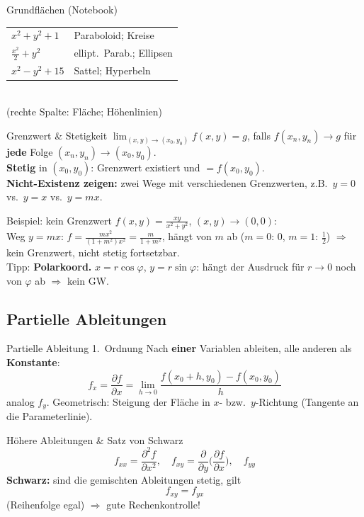 \documentclass[a4paper, fontsize=7pt]{scrartcl}
\newcommand{\pdn}[2]{\frac{\partial #1}{\partial #2}}
\begin{document}
\begin{subbox}{Grundflächen (Notebook)}
\setlength{\tabcolsep}{3pt}
\begin{tabular}{@{}l|l@{}}
$x^2 + y^2 + 1$ & Paraboloid; Kreise \\
$\frac{x^2}{2} + y^2$ & ellipt.\ Parab.; Ellipsen \\
$x^2 - y^2 + 15$ & Sattel; Hyperbeln \\
\end{tabular}\\[1pt]
(rechte Spalte: Fläche; Höhenlinien)
\end{subbox}

\begin{mainbox}{Grenzwert \& Stetigkeit}
$\displaystyle\lim_{(x,y) \to (x_0,y_0)} f(x, y) = g$, falls $f(x_n, y_n) \to g$
für \textbf{jede} Folge $(x_n, y_n) \to (x_0, y_0)$.\\
\textbf{Stetig} in $(x_0, y_0)$: Grenzwert existiert und $= f(x_0, y_0)$.\\[2pt]
\textbf{Nicht-Existenz zeigen:} zwei Wege mit verschiedenen Grenzwerten,
z.B.\ $y = 0$ vs.\ $y = x$ vs.\ $y = mx$.
\end{mainbox}

\begin{subbox}{Beispiel: kein Grenzwert}
$f(x, y) = \frac{xy}{x^2 + y^2}$, $(x, y) \to (0, 0)$:\\
Weg $y = mx$: $f = \frac{m x^2}{(1 + m^2) x^2} = \frac{m}{1 + m^2}$,
hängt von $m$ ab ($m = 0$: $0$, $m = 1$: $\frac{1}{2}$)
$\Rightarrow$ kein Grenzwert, nicht stetig fortsetzbar.\\[2pt]
Tipp: \textbf{Polarkoord.} $x = r\cos\varphi$, $y = r\sin\varphi$: hängt
der Ausdruck für $r \to 0$ noch von $\varphi$ ab $\Rightarrow$ kein GW.
\end{subbox}

\subsection{Partielle Ableitungen}

\begin{mainbox}{Partielle Ableitung 1.\ Ordnung}
Nach \textbf{einer} Variablen ableiten, alle anderen als \textbf{Konstante}:
$$f_x = \pdn{f}{x} = \lim_{h \to 0} \frac{f(x_0 + h, y_0) - f(x_0, y_0)}{h}$$
analog $f_y$. Geometrisch: Steigung der Fläche in $x$- bzw.\
$y$-Richtung (Tangente an die Parameterlinie).
\end{mainbox}

\begin{mainbox}{Höhere Ableitungen \& Satz von Schwarz}
$$f_{xx} = \pdn{^2 f}{x^2}, \quad f_{xy} = \pdn{}{y}\Big(\pdn{f}{x}\Big),
\quad f_{yy}$$
\textbf{Schwarz:} sind die gemischten Ableitungen stetig, gilt
$$f_{xy} = f_{yx}$$
(Reihenfolge egal) $\Rightarrow$ gute Rechenkontrolle!
\end{mainbox}
\end{document}

